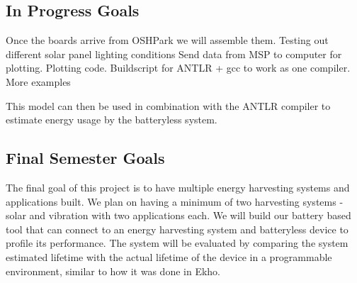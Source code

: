 \subsection{In Progress Goals}

Once the boards arrive from OSHPark we will assemble them.
Testing out different solar panel lighting conditions
Send data from MSP to computer for plotting.
Plotting code.
Buildscript for ANTLR + gcc to work as one compiler.
More examples

This model can then be used in combination with the ANTLR compiler to estimate energy usage by the batteryless system.




\subsection{Final Semester Goals}
The final goal of this project is to have multiple energy harvesting systems and applications built.
We plan on having a minimum of two harvesting systems - solar and vibration with two applications each.
We will build our battery based tool that can connect to an energy harvesting system and batteryless device to profile its performance.
The system will be evaluated by comparing the system estimated lifetime with the actual lifetime of the device in a programmable environment, similar to how it was done in Ekho.
